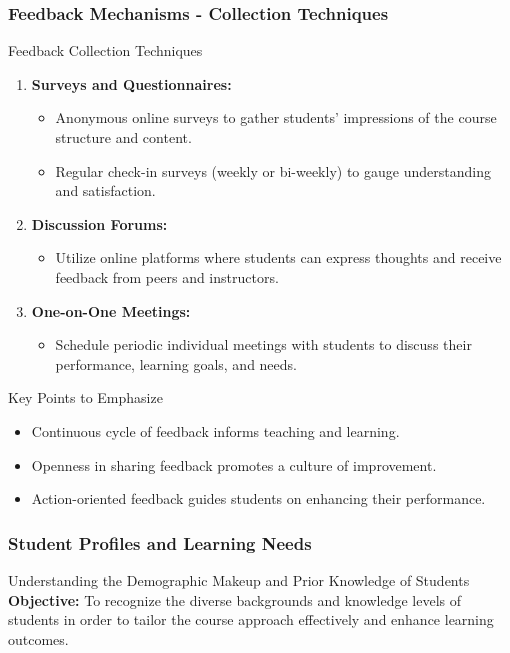 \documentclass[aspectratio=169]{beamer}
\begin{document}
\begin{frame}[fragile]
    \frametitle{Feedback Mechanisms - Collection Techniques}
    \begin{block}{Feedback Collection Techniques}
        \begin{enumerate}
            \item \textbf{Surveys and Questionnaires:}
            \begin{itemize}
                \item Anonymous online surveys to gather students' impressions of the course structure and content.
                \item Regular check-in surveys (weekly or bi-weekly) to gauge understanding and satisfaction.
            \end{itemize}
            \item \textbf{Discussion Forums:}
            \begin{itemize}
                \item Utilize online platforms where students can express thoughts and receive feedback from peers and instructors.
            \end{itemize}
            \item \textbf{One-on-One Meetings:}
            \begin{itemize}
                \item Schedule periodic individual meetings with students to discuss their performance, learning goals, and needs.
            \end{itemize}
        \end{enumerate}
    \end{block}

    \begin{block}{Key Points to Emphasize}
        \begin{itemize}
            \item Continuous cycle of feedback informs teaching and learning.
            \item Openness in sharing feedback promotes a culture of improvement.
            \item Action-oriented feedback guides students on enhancing their performance.
        \end{itemize}
    \end{block}
\end{frame}

\begin{frame}[fragile]
    \frametitle{Student Profiles and Learning Needs}
    \begin{block}{Understanding the Demographic Makeup and Prior Knowledge of Students}
        \textbf{Objective:}  
        To recognize the diverse backgrounds and knowledge levels of students in order to tailor the course approach effectively and enhance learning outcomes.
    \end{block}
\end{frame}
\end{document}
